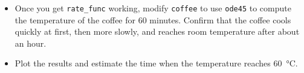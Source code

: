 \begin{ex}
\begin{itemize}
\item Once you get \verb"rate_func" working, modify
{\tt coffee} to use {\tt ode45} to compute the temperature
of the coffee for 60 minutes.  Confirm that
the coffee cools quickly at first, then more slowly, and reaches
room temperature after about an hour.

\item Plot the results and estimate the time when the temperature reaches \SI{60}{\celsius}.

\end{itemize}

\end{ex}




